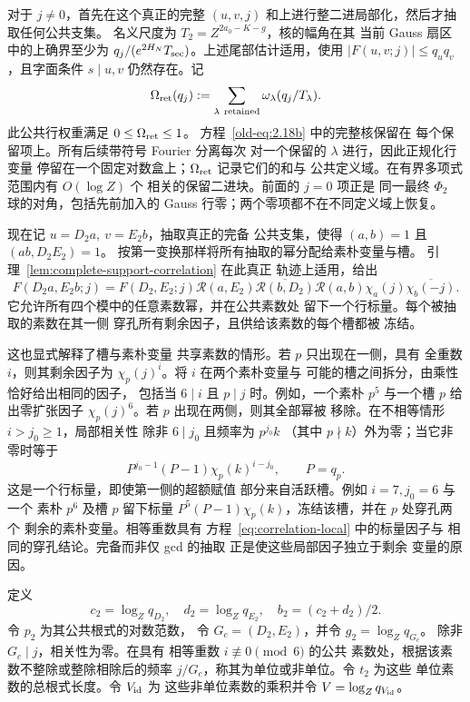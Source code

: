 \documentclass[11pt,a4paper]{article}
\numberwithin{equation}{section}
\numberwithin{figure}{section}
\theoremstyle{definition}
\theoremstyle{remark}
\begin{document}
对于 \(j\ne0\)，首先在这个真正的完整
\((u,v,j)\) 和上进行整二进局部化，然后才抽取任何公共支集。
名义尺度为
\(T_2=Z^{2a_0-K-g}\)，核的幅角在其
当前 Gauss 扇区中的上确界至少为
\(q_j/(e^{2H_N}T_{\rm sec})\)。上述尾部估计适用，使用
\(|F(u,v;j)|\le q_uq_v\)，且字面条件
\(s\mid u,v\) 仍然存在。记
\[
 \Omega_{\rm ret}(q_j)
 :=\sum_{\lambda\ {\rm retained}}\omega_\lambda(q_j/T_\lambda).
\]
此公共行权重满足 \(0\le\Omega_{\rm ret}\le1\)。
方程~\eqref{old-eq:2.18b} 中的完整核保留在
每个保留项上。所有后续带符号 Fourier 分离每次
对一个保留的 \(\lambda\) 进行，因此正规化行变量
停留在一个固定对数盒上；\(\Omega_{\rm ret}\) 记录它们的和与
公共定义域。在有界多项式范围内有 \(O(\log Z)\) 个
相关的保留二进块。前面的 \(j=0\) 项正是
同一最终 \(\Phi_2\) 球的对角，包括先前加入的
Gauss 行零；两个零项都不在不同定义域上恢复。

现在记 \(u=D_2a,\ v=E_2b\)，抽取真正的完备
公共支集，使得 \((a,b)=1\) 且 \((ab,D_2E_2)=1\)。
按第一变换那样将所有抽取的幂分配给素朴变量与槽。
引理~\ref{lem:complete-support-correlation} 在此真正
轨迹上适用，给出
\[
 F(D_2a,E_2b;j)=F(D_2,E_2;j)\mathcal R(a,E_2)
   \overline{\mathcal R(b,D_2)}\mathcal R(a,b)
   \chi_a(j)\overline{\chi_b(-j)}.
\]
它允许所有四个模中的任意素数幂，并在公共素数处
留下一个行标量。每个被抽取的素数在其一侧
穿孔所有剩余因子，且供给该素数的每个槽都被
冻结。

这也显式解释了槽与素朴变量
共享素数的情形。若 \(p\) 只出现在一侧，具有
全重数 \(i\)，则其剩余因子为
\(\chi_p(j)^i\)。将 \(i\) 在两个素朴变量与
可能的槽之间拆分，由乘性恰好给出相同的因子，
包括当 \(6\mid i\) 且 \(p\mid j\) 时。例如，一个素朴
\(p^5\) 与一个槽 \(p\) 给出零扩张因子
\(\chi_p(j)^6\)。若 \(p\) 出现在两侧，则其全部幂被
移除。在不相等情形 \(i>j_0\ge1\)，局部相关性
除非 \(6\mid j_0\) 且频率为 \(p^{j_0}k\)
（其中 \(p\nmid k\)）外为零；当它非零时等于
\[
 P^{j_0-1}(P-1)\chi_p(k)^{i-j_0},\qquad P=q_p.
\]
这是一个行标量，即使第一侧的超额赋值
部分来自活跃槽。例如 \(i=7,j_0=6\) 与一个
素朴 \(p^6\) 及槽 \(p\) 留下标量
\(P^5(P-1)\chi_p(k)\)，冻结该槽，并在 \(p\) 处穿孔两个
剩余的素朴变量。相等重数具有
方程~\eqref{eq:correlation-local} 中的标量因子与
相同的穿孔结论。完备而非仅 gcd 的抽取
正是使这些局部因子独立于剩余
变量的原因。

定义
\[
 c_2=\log_Zq_{D_2},\quad d_2=\log_Zq_{E_2},\quad
 b_2=(c_2+d_2)/2.
\]
令 \(p_2\) 为其公共根式的对数范数，
令 \(G_c=(D_2,E_2)\)，并令 \(g_2=\log_Zq_{G_c}\)。
除非 \(G_c\mid j\)，相关性为零。在具有
相等重数 \(i\not\equiv0\pmod6\) 的公共
素数处，根据该素数不整除或整除相除后的频率
\(j/G_c\)，称其为单位或非单位。令 \(t_2\) 为这些
单位素数的总根式长度。令 \(V_{\rm id}\) 为
这些非单位素数的乘积并令
\(V=\log_Zq_{V_{\rm id}}\)。
\end{document}
